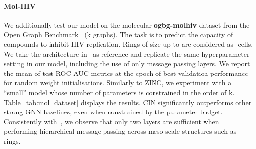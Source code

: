 \documentclass{article}
\begin{document}
\paragraph{Mol-HIV} We additionally test our model on the molecular \textbf{ogbg-molhiv} dataset from the Open Graph Benchmark~\citep{hu2020open} (k graphs). The task is to predict the capacity of compounds to inhibit HIV replication. Rings of size up to  are considered as -cells. We take the architecture in~\cite{Fey2020_himp} as reference and replicate the same hyperparameter setting in our model, including the use of only  message passing layers. We report the mean of test ROC-AUC metrics at the epoch of best validation performance for  random weight initialisations. Similarly to ZINC, we experiment with a ``small'' model whose number of parameters is constrained in the order of k. Table~\ref{tab:mol_dataset} displays the results. CIN significantly outperforms other strong GNN baselines, even when constrained by the parameter budget. Consistently with~\cite{Fey2020_himp}, we observe that only two layers are sufficient when performing hierarchical message passing across meso-scale structures such as rings.
\end{document}
